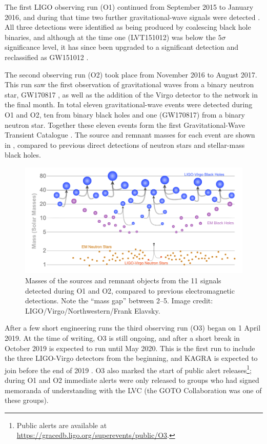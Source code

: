 \begin{colsection}
The first LIGO observing run (O1)  continued from September 2015 to January 2016, and during that time two further gravitational-wave signals were detected \citep{LIGO_O1}. All three detections were identified as being produced by coalescing black hole binaries, and although at the time one (LVT151012) was below the $5\sigma$ significance level, it has since been upgraded to a significant detection and reclassified as GW151012 \citep{GW_catalog}.

The second observing run (O2)  took place from November 2016 to August 2017. This run saw the first observation of gravitational waves from a binary neutron star, GW170817 \citep{GW170817}, as well as the addition of the Virgo detector to the network in the final month. In total eleven gravitational-wave events were detected during O1 and O2, ten from binary black holes and one (GW170817) from a binary neutron star. Together these eleven events form the first Gravitational-Wave Transient Catalogue  \citep[GWTC-1;][]{GW_catalog}. The source and remnant masses for each event are shown in , compared to previous direct detections of neutron stars and stellar-mass black holes.

\begin{figure}[t]
    \begin{center}
        \includegraphics[width=\linewidth]{images/gw_masses2.png}
    \end{center}
    \caption[Sources of gravitational waves detected during O1 and O2]{
        Masses of the sources and remnant objects from the 11 signals detected during O1 and O2, compared to previous electromagnetic detections. Note the ``mass gap'' between 2--\SI{5}{\solarmass}. Image credit: LIGO/Virgo/Northwestern/Frank Elavsky.
        }\label{fig:gw_masses}
\end{figure}

After a few short engineering runs the third observing run (O3)  began on 1 April 2019. At the time of writing, O3 is still ongoing, and after a short break in October 2019 is expected to run until May 2020. This is the first run to include the three LIGO-Virgo detectors from the beginning, and KAGRA is expected to join before the end of 2019 \citep{LIGO-Virgo-KAGRA}. O3 also marked the start of public alert releases\footnote{Public alerts are available at \url{https://gracedb.ligo.org/superevents/public/O3}.}; during O1 and O2 immediate alerts were only released to groups who had signed memoranda of understanding with the LVC (the GOTO Collaboration was one of these groups).


\end{colsection}
